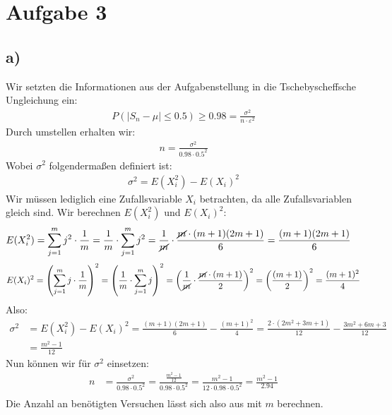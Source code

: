 \pagebreak
\section*{Aufgabe 3}
\subsection*{a)}
Wir setzten die Informationen aus der Aufgabenstellung in die Tschebyscheffsche Ungleichung ein:
\begin{align*}
  P(|S_n - \mu|\le 0.5) \ge 0.98 = \frac{ \sigma^2 }{n\cdot\varepsilon^2 }
\end{align*}
Durch umstellen erhalten wir:
\begin{align*}
  n = \frac{ \sigma^2 }{0.98 \cdot 0.5^2 }
\end{align*}
Wobei $ \sigma^2 $ folgendermaßen definiert ist:
\begin{align*}
  \sigma^2 = E(X_i^2) - E(X_i)^2
\end{align*}
Wir müssen lediglich eine Zufallsvariable $ X_i $ betrachten, da alle Zufallsvariablen gleich sind.
Wir berechnen $ E(X_i^2) $ und $ E(X_i)^2 $:
\begin{align*}
  E(X_i^2) &= \sum_{j=1}^{m} j^2 \cdot \frac{ 1 }{ m } = \frac{ 1 }{ m } \cdot \sum_{j=1}^{m}j^2 = \frac{ 1 }{ \cancel{m} } \cdot \frac{ \cancel{m}\cdot (m+1)(2m+1) }{ 6 }  = \frac{ (m+1)(2m+1) }{ 6 }
\end{align*}
\begin{align*}
  E(X_i)^2 &= \left(\sum_{j=1}^{m} j \cdot \frac{ 1 }{ m }\right)^2 = \left(\frac{ 1 }{ m } \cdot \sum_{j=1}^{m}j\right)^2 = \left(\frac{ 1 }{ \cancel{m} } \cdot \frac{ \cancel{m}\cdot (m+1) }{ 2 }\right)^2 = \left(\frac{ (m+1) }{ 2 }\right)^2 = \frac{ (m+1)^2 }{ 4 }\\
\end{align*}
Also:
\begin{align*}
  \sigma^2 &= E(X_i^2) - E(X_i)^2 = \frac{ (m+1)(2m+1) }{ 6 } - \frac{ (m+1)^2 }{ 4 } = \frac{ 2\cdot (2m^2+3m+ 1) }{ 12 } - \frac{ 3m^2 + 6m + 3 }{ 12 }\\ &=\frac{ m^2-1}{ 12 }
\end{align*}
Nun können wir für $ \sigma^2 $ einsetzen:
\begin{align*}
  n &= \frac{ \sigma^2 }{0.98 \cdot 0.5^2 } = \frac{ \frac{ m^2-1 }{ 12 } }{0.98 \cdot 0.5^2 } = \frac{ m^2-1 }{ 12 \cdot 0.98 \cdot 0.5^2 } = \frac{ m^2-1 }{ 2.94 }\\
\end{align*}
Die Anzahl an benötigten Versuchen lässt sich also aus mit $ m $ berechnen.
